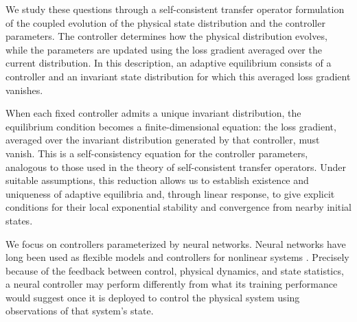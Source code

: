 \documentclass[11pt]{article}
\theoremstyle{definition}
\theoremstyle{remark}
\begin{document}
We study these questions through a self-consistent transfer
operator formulation of the coupled evolution of the physical
state distribution and the controller parameters.
The controller determines how the physical distribution evolves,
while the parameters are updated using the loss gradient averaged
over the current distribution.
In this description, an adaptive equilibrium consists of
a controller and an invariant state distribution for which
this averaged  loss gradient vanishes.

When each fixed controller admits a unique invariant distribution,
the equilibrium condition becomes a finite-dimensional equation:
the loss gradient, averaged over the invariant distribution
generated by that controller, must vanish.
This is a self-consistency equation for the controller parameters,
analogous to those used in the theory of self-consistent transfer
operators.
Under suitable assumptions, this reduction allows us to establish
existence and uniqueness of adaptive equilibria and, through linear
response, to give explicit conditions for their local exponential
stability and convergence from nearby initial states.


We focus on controllers parameterized by neural networks. Neural networks have long been used as flexible models and
controllers for nonlinear systems
\cite{NarendraParthasarathy1990,hunt1992neural,
sjoberg1995nonlinear,levine2016end}.
Precisely because of the feedback between control, physical
dynamics, and state statistics, a neural controller may
perform differently from what its training performance
would suggest once it is deployed to control the physical
system using observations of that system's state.





\end{document}
